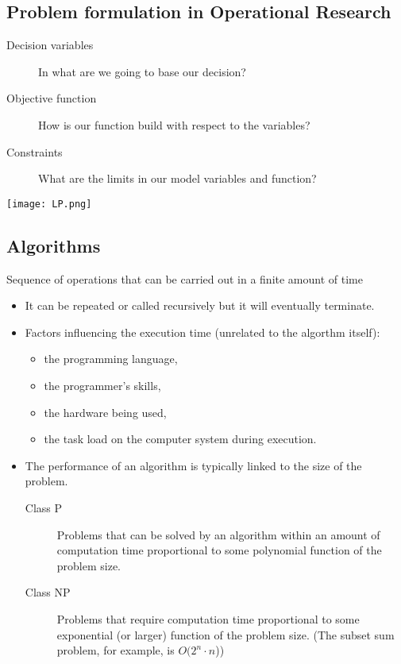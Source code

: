 \subsection{Problem formulation in Operational Research}

      \begin{description}
        \item[Decision variables] In what are we going to base our decision?
        \item[Objective function] How is our function build with respect to the variables?
        \item[Constraints] What are the limits in our model variables and function?
      \end{description}

      \begin{center}
        \texttt{[image: LP.png]}
      \end{center}

\subsection{Algorithms}


    Sequence of operations that can be carried out in a finite amount of time
  \begin{itemize}
    \item It can be repeated or called recursively but it will eventually terminate.
    \item Factors influencing the execution time (unrelated to the algorthm itself):
    \begin{itemize}
      \item the programming language,
      \item the programmer's skills,
      \item the hardware being used,
      \item the task load on the computer system during execution.
    \end{itemize}
    \item The performance of an algorithm is typically linked to the size of the problem.
    \begin{description}
      \item [Class P] Problems that can be solved by an algorithm within an amount of computation time proportional to some polynomial function of the problem size.
      \item [Class NP] Problems that require computation time proportional to some exponential (or larger) function of the problem size. (The subset sum problem, for example, is $O(2^n\cdot n$))
    \end{description}
  \end{itemize}


